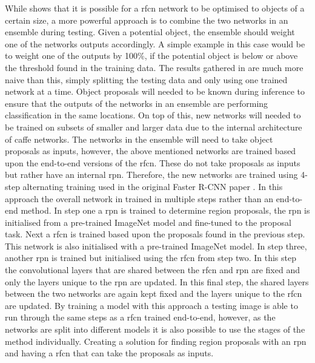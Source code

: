 While  shows that it is possible for a \gls{rfcn} network to be optimised to objects of a certain size, a more powerful approach is to combine the two networks in an ensemble during testing. Given a potential object, the ensemble should weight one of the networks outputs accordingly. A simple example in this case would be to weight one of the outputs by 100\%, if the potential object is below or above the threshold found in the training data. The results gathered in  are much more naive than this, simply splitting the testing data and only using one trained network at a time. Object proposals will needed to be known during inference to ensure that the outputs of the networks in an ensemble are performing classification in the same locations. On top of this, new networks will needed to be trained on subsets of smaller and larger data due to the internal architecture of \gls{caffe} networks. The networks in the ensemble will need to take object proposals as inputs, however, the above mentioned networks are trained based upon the end-to-end versions of the \gls{rfcn}. These do not take proposals as inputs but rather have an internal \gls{rpn}. Therefore, the new networks are trained using 4-step alternating training used in the original Faster R-CNN paper \cite{fasterrcnn}. In this approach the overall network in trained in multiple steps rather than an end-to-end method. In step one a \gls{rpn} is trained to determine region proposals, the \gls{rpn} is initialised from a pre-trained ImageNet model and fine-tuned to the proposal task. Next a \gls{rfcn} is trained based upon the proposals found in the previous step. This network is also initialised with a pre-trained ImageNet model. In step three, another \gls{rpn} is trained but initialised using the \gls{rfcn} from step two. In this step the convolutional layers that are shared between the \gls{rfcn} and \gls{rpn} are fixed and only the layers unique to the \gls{rpn} are updated. In this final step, the shared layers between the two networks are again kept fixed and the layers unique to the \gls{rfcn} are updated. By training a model with this approach a testing image is able to run through the same steps as a \gls{rfcn} trained end-to-end, however, as the networks are split into different models it is also possible to use the stages of the method individually. Creating a solution for finding region proposals with an \gls{rpn} and having a \gls{rfcn} that can take the proposals as inputs. 
\\\\
